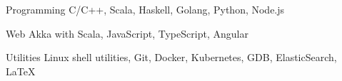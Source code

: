 
\vspace{-0.3cm}


\begin{cvskills}


  \cvskill
  {Programming}
  {C/C++, Scala, Haskell, Golang, Python, Node.js}


  \cvskill
  {Web}
  {Akka with Scala, JavaScript, TypeScript, Angular}


  \cvskill
  {Utilities}
  {Linux shell utilities, Git, Docker,
    Kubernetes, GDB, ElasticSearch, \LaTeX}


\end{cvskills}

